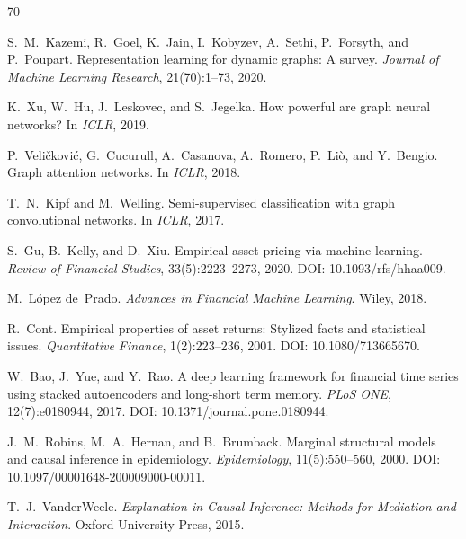 \documentclass[11pt]{article}
\begin{document}
\begin{thebibliography}{70}

S.~M.~Kazemi, R.~Goel, K.~Jain, I.~Kobyzev, A.~Sethi, P.~Forsyth, and P.~Poupart.
\newblock Representation learning for dynamic graphs: A survey.
\newblock \emph{Journal of Machine Learning Research}, 21(70):1--73, 2020.

K.~Xu, W.~Hu, J.~Leskovec, and S.~Jegelka.
\newblock How powerful are graph neural networks?
\newblock In \emph{ICLR}, 2019.

P.~Veli{\v{c}}kovi{\'c}, G.~Cucurull, A.~Casanova, A.~Romero, P.~Li{\`o}, and Y.~Bengio.
\newblock Graph attention networks.
\newblock In \emph{ICLR}, 2018.

T.~N.~Kipf and M.~Welling.
\newblock Semi-supervised classification with graph convolutional networks.
\newblock In \emph{ICLR}, 2017.

S.~Gu, B.~Kelly, and D.~Xiu.
\newblock Empirical asset pricing via machine learning.
\newblock \emph{Review of Financial Studies}, 33(5):2223--2273, 2020. DOI: 10.1093/rfs/hhaa009.

M.~L{\'o}pez de~Prado.
\newblock \emph{Advances in Financial Machine Learning}.
\newblock Wiley, 2018.

R.~Cont.
\newblock Empirical properties of asset returns: Stylized facts and statistical issues.
\newblock \emph{Quantitative Finance}, 1(2):223--236, 2001. DOI: 10.1080/713665670.

W.~Bao, J.~Yue, and Y.~Rao.
\newblock A deep learning framework for financial time series using stacked autoencoders and long-short term memory.
\newblock \emph{PLoS ONE}, 12(7):e0180944, 2017. DOI: 10.1371/journal.pone.0180944.

J.~M.~Robins, M.~A.~Hernan, and B.~Brumback.
\newblock Marginal structural models and causal inference in epidemiology.
\newblock \emph{Epidemiology}, 11(5):550--560, 2000. DOI: 10.1097/00001648-200009000-00011.

T.~J.~VanderWeele.
\newblock \emph{Explanation in Causal Inference: Methods for Mediation and Interaction}.
\newblock Oxford University Press, 2015.


\end{thebibliography}
\end{document}
